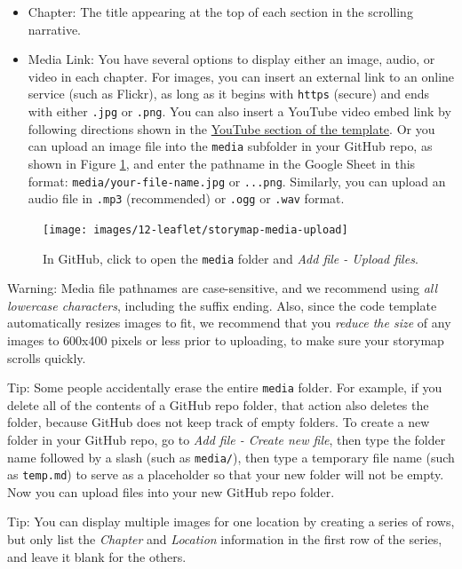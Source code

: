 \documentclass[
  english,
]{book}
\begin{document}
\begin{itemize}
\item
  Chapter: The title appearing at the top of each section in the scrolling narrative.
\item
  Media Link: You have several options to display either an image, audio, or video in each chapter. For images, you can insert an external link to an online service (such as Flickr), as long as it begins with \texttt{https} (secure) and ends with either \texttt{.jpg} or \texttt{.png}. You can also insert a YouTube video embed link by following directions shown in the \href{https://handsondataviz.github.io/leaflet-storymaps-with-google-sheets/\#9}{YouTube section of the template}. Or you can upload an image file into the \texttt{media} subfolder in your GitHub repo, as shown in Figure \ref{fig:storymap-media-upload}, and enter the pathname in the Google Sheet in this format: \texttt{media/your-file-name.jpg} or \texttt{...png}. Similarly, you can upload an audio file in \texttt{.mp3} (recommended) or \texttt{.ogg} or \texttt{.wav} format.
\end{itemize}



\begin{figure}
\texttt{[image: images/12-leaflet/storymap-media-upload]} \caption{In GitHub, click to open the \texttt{media} folder and \emph{Add file - Upload files}.}\label{fig:storymap-media-upload}
\end{figure}

Warning: Media file pathnames are case-sensitive, and we recommend using \emph{all lowercase characters}, including the suffix ending. Also, since the code template automatically resizes images to fit, we recommend that you \emph{reduce the size} of any images to 600x400 pixels or less prior to uploading, to make sure your storymap scrolls quickly.

Tip: Some people accidentally erase the entire \texttt{media} folder. For example, if you delete all of the contents of a GitHub repo folder, that action also deletes the folder, because GitHub does not keep track of empty folders. To create a new folder in your GitHub repo, go to \emph{Add file - Create new file}, then type the folder name followed by a slash (such as \texttt{media/}), then type a temporary file name (such as \texttt{temp.md}) to serve as a placeholder so that your new folder will not be empty. Now you can upload files into your new GitHub repo folder.

Tip: You can display multiple images for one location by creating a series of rows, but only list the \emph{Chapter} and \emph{Location} information in the first row of the series, and leave it blank for the others.
\end{document}
